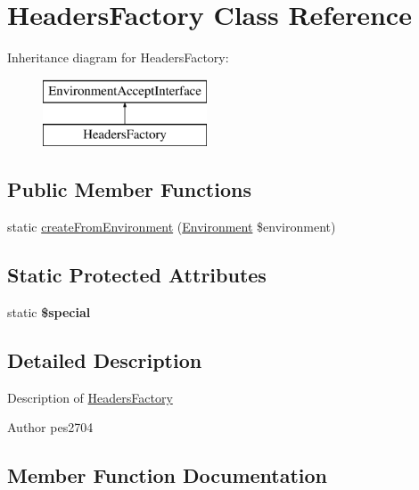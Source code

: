 \hypertarget{class_pes_1_1_http_1_1_factory_1_1_headers_factory}{}\section{Headers\+Factory Class Reference}
\label{class_pes_1_1_http_1_1_factory_1_1_headers_factory}
Inheritance diagram for Headers\+Factory\+:\begin{figure}[H]
\begin{center}
\leavevmode
\includegraphics[height=2.000000cm]{class_pes_1_1_http_1_1_factory_1_1_headers_factory}
\end{center}
\end{figure}
\subsection*{Public Member Functions}
\begin{DoxyCompactItemize}
\item 
static \mbox{\hyperlink{class_pes_1_1_http_1_1_factory_1_1_headers_factory_a1f73343634b92b36d1967217c008e396}{create\+From\+Environment}} (\mbox{\hyperlink{class_pes_1_1_http_1_1_environment}{Environment}} \$environment)
\end{DoxyCompactItemize}
\subsection*{Static Protected Attributes}
\begin{DoxyCompactItemize}
\item 
static {\bfseries \$special}
\end{DoxyCompactItemize}


\subsection{Detailed Description}
Description of \mbox{\hyperlink{class_pes_1_1_http_1_1_factory_1_1_headers_factory}{Headers\+Factory}}

\begin{DoxyAuthor}{Author}
pes2704 
\end{DoxyAuthor}


\subsection{Member Function Documentation}
\mbox{\label{class_pes_1_1_http_1_1_factory_1_1_headers_factory_a1f73343634b92b36d1967217c008e396}} 
